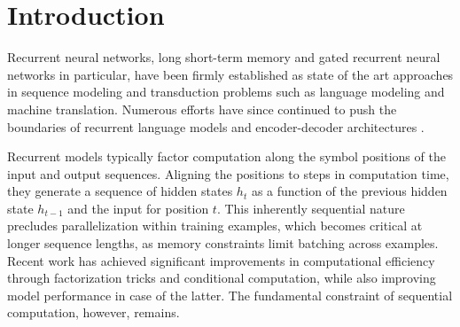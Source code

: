 \documentclass{article}
\begin{document}
\section{Introduction}
Recurrent neural networks, long short-term memory\cite{13} and gated recurrent neural networks \cite{7}  in particular, have been firmly established as state of the art approaches in sequence modeling and transduction problems such as language modeling and machine translation\cite{35,2,5}.
Numerous efforts have since continued to push the boundaries of recurrent language models and encoder-decoder architectures \cite{38,24,15}.

Recurrent models typically factor computation along the symbol positions of the input and output sequences.
Aligning the positions to steps in computation time, they generate a sequence of hidden states $h_t$ as a function of the previous hidden state $h_{t-1}$ and the input for position $t$.
This inherently sequential nature precludes parallelization within training examples, which becomes critical at longer sequence lengths, as memory constraints limit batching across examples.
Recent work has achieved significant improvements in computational efficiency through factorization tricks\cite{21} and conditional computation\cite{32}, while also improving model performance in case of the latter.
The fundamental constraint of sequential computation, however, remains.
\end{document}
